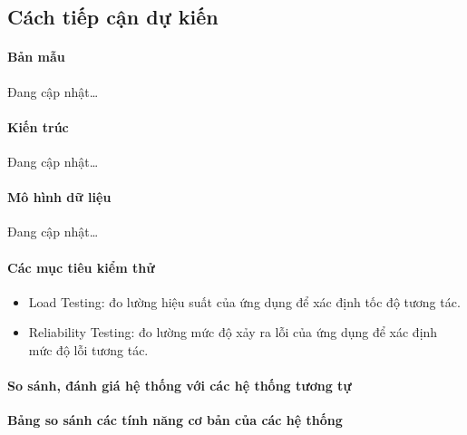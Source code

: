 \subsection{Cách tiếp cận dự kiến}
\paragraph{Bản mẫu}
\tab Đang cập nhật\dots

\paragraph{Kiến trúc}
\tab Đang cập nhật\dots

\paragraph{Mô hình dữ liệu}
\tab Đang cập nhật\dots

\paragraph{Các mục tiêu kiểm thử}
\begin{itemize}
    \item Load Testing: đo lường hiệu suất của ứng dụng để xác định tốc độ tương tác.
    \item Reliability Testing: đo lường mức độ xảy ra lỗi của ứng dụng để xác định mức độ lỗi tương tác.
\end{itemize}

\paragraph{So sánh, đánh giá hệ thống với các hệ thống tương tự}
\tab \textbf{Bảng so sánh các tính năng cơ bản của các hệ thống}

